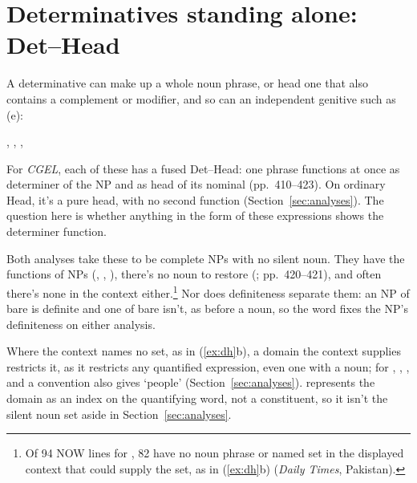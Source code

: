 %

\section{Determinatives standing alone: Det--Head}\label{sec:det-head}

A determinative can make up a whole noun phrase, or head one that also contains a complement or modifier, and so can an independent genitive such as  (e):

\ea\label{ex:dh}
\ea {}
\ex {}
\ex {}, , 
\ex {}, 
\ex {}
\z\z

For \textit{CGEL}, each of these has a fused Det--Head: one phrase functions at once as determiner of the NP and as head of its nominal (pp.~410--423). On ordinary Head, it's a pure head, with no second function (Section~\ref{sec:analyses}). The question here is whether anything in the form of these expressions shows the determiner function.

Both analyses take these to be complete NPs with no silent noun. They have the functions of NPs (, , ), there's no noun to restore (; pp.~420--421), and often there's none in the context either.\footnote{Of 94 NOW lines for , 82 have no noun phrase or named set in the displayed context that could supply the set, as in (\ref{ex:dh}b) (\textit{Daily Times}, Pakistan).} Nor does definiteness separate them: an NP of bare  is definite and one of bare  isn't, as before a noun, so the word fixes the NP's definiteness on either analysis.

Where the context names no set, as in (\ref{ex:dh}b), a domain the context supplies restricts it, as it restricts any quantified expression, even one with a noun; for , , , and  a convention also gives \enquote*{people} (Section~\ref{sec:analyses}). \Textcite[43]{vonfintel1994} represents the domain as an index on the quantifying word, not a constituent, so it isn't the silent noun set aside in Section~\ref{sec:analyses}.

